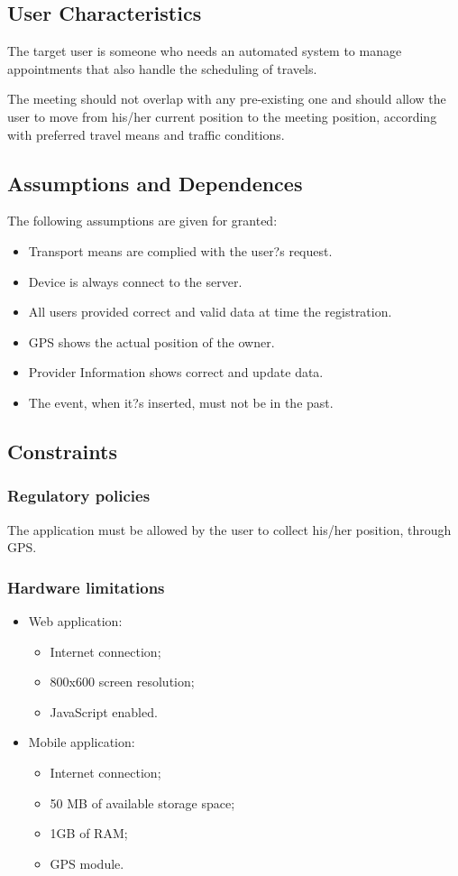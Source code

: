 \documentclass{article}
\begin{document}
	
	\subsection{User Characteristics}
	The target user is someone who needs an automated system to manage appointments that also handle the scheduling of travels.
	
	The meeting should not overlap with any pre-existing one and should allow the user to move from his/her current position to the meeting position, according with preferred travel means and traffic conditions.
	
	
	\subsection{Assumptions and Dependences}
	The following assumptions are given for granted:
	\begin{itemize}
	\item  Transport means are complied with the user?s request.
	\item  Device is always connect to the server.
	\item  All users provided correct and valid data at time the registration.
	\item  GPS shows the actual position of the owner.
	\item  Provider Information shows correct and update data.
	\item  The event, when it?s inserted, must not be in the past.
	\end{itemize}
	
	
	\subsection{Constraints}
	
	
	\subsubsection{Regulatory policies}
	The application must be allowed by the user to collect his/her position, through GPS.
	
	
	\subsubsection{Hardware limitations}
	\begin{itemize}
	\item Web application:
		\begin{itemize}
		\item Internet connection;
		\item 800x600 screen resolution;
		\item JavaScript enabled.
		\end{itemize}
	\item Mobile application:
		\begin{itemize}
		\item Internet connection;
		\item 50 MB of available storage space;
		\item 1GB of RAM;
		\item GPS module.
		\end{itemize}
	\end{itemize}
	
\end{document}
